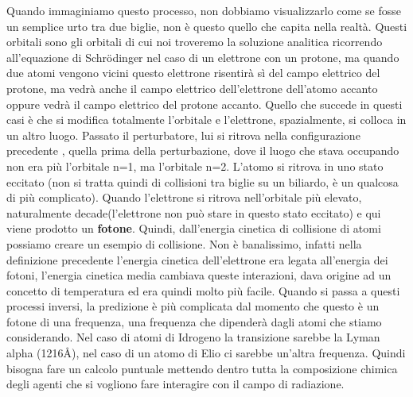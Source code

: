\documentclass[a4paper,11pt]{article}
\begin{document}
Quando immaginiamo questo processo, non dobbiamo visualizzarlo come se fosse un semplice urto tra due biglie, non è questo quello che capita nella realtà. Questi orbitali sono gli orbitali di cui noi troveremo la soluzione analitica ricorrendo all'equazione di Schrödinger nel caso di un elettrone con un protone, ma quando due atomi vengono vicini questo elettrone risentirà sì del campo elettrico del protone, ma vedrà anche il campo elettrico dell'elettrone dell'atomo accanto oppure vedrà il campo elettrico del protone accanto. Quello che succede in questi casi è che si modifica totalmente l'orbitale e l'elettrone, spazialmente, si colloca in un altro luogo. Passato il perturbatore, lui si ritrova nella configurazione precedente , quella prima della perturbazione, dove il luogo che stava occupando non era più l'orbitale n=1, ma l'orbitale n=2. L'atomo si ritrova in uno stato eccitato (non si tratta quindi di collisioni tra biglie su un biliardo, è un qualcosa di più complicato).
\newline
Quando l'elettrone si ritrova nell'orbitale più elevato, naturalmente decade(l'elettrone non può stare in questo stato eccitato) e qui viene prodotto un \textbf{fotone}. Quindi, dall'energia cinetica di collisione di atomi possiamo creare un esempio di collisione. Non è banalissimo, infatti nella definizione precedente l'energia cinetica dell'elettrone era legata all'energia dei fotoni, l'energia cinetica media cambiava queste interazioni, dava origine ad un concetto di temperatura ed era quindi molto più facile.
\newline
Quando si passa a questi processi inversi, la predizione è più complicata dal momento che questo è un fotone di una frequenza, una frequenza che dipenderà dagli atomi che stiamo considerando. Nel caso di atomi di Idrogeno la transizione sarebbe la Lyman alpha (1216Å), nel caso di un atomo di Elio ci sarebbe un'altra frequenza. Quindi bisogna fare un calcolo puntuale mettendo dentro tutta la composizione chimica degli agenti che si vogliono fare interagire con il campo di radiazione.
\end{document}
